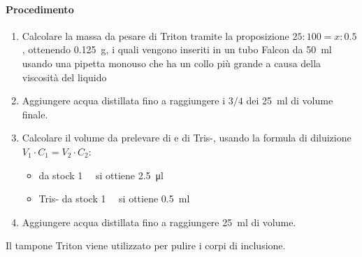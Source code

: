 \paragraph{Procedimento}
\begin{enumerate}
	\item Calcolare la massa da pesare di Triton tramite la proposizione \(25:100=x:0.5\), ottenendo \qty{0.125}{\g}, i quali vengono inseriti in un tubo Falcon da \qty{50}{\ml} usando una pipetta monouso che ha un collo più grande a causa della viscosità del liquido
	\item Aggiungere acqua distillata fino a raggiungere i \(3/4\) dei \qty{25}{\ml} di volume finale.
	\item Calcolare il volume da prelevare di  e di Tris-, usando la formula di diluizione \mbox{\(V_1\cdot C_1 = V_2\cdot C_2\)}:
	      \begin{itemize}
		      \item {} da stock \qty{1}{\milli\Molar} si ottiene \qty{2.5}{\micro\litre}
		      \item Tris- da stock \qty{1}{\milli\Molar} si ottiene \qty{0.5}{\ml}
	      \end{itemize}
	\item Aggiungere acqua distillata fino a raggiungere \qty{25}{\ml} di volume.
\end{enumerate}
Il tampone Triton viene utilizzato per pulire i corpi di inclusione.


